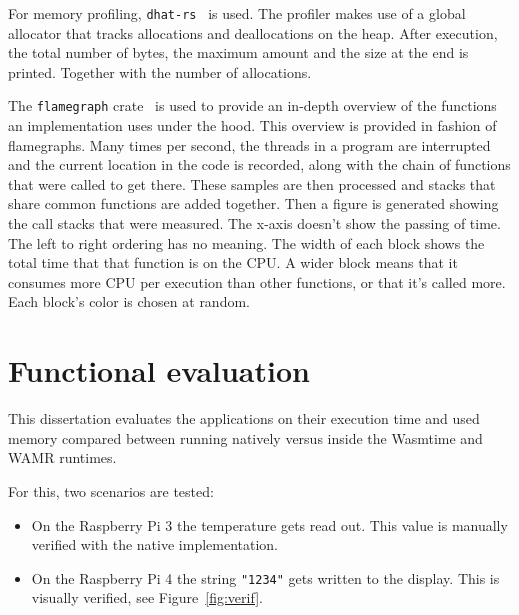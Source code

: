 For memory profiling, \texttt{dhat-rs}~\cite{gh:dhat} is used. The profiler makes use of a global allocator that tracks allocations and deallocations on the heap. After execution, the total number of bytes, the maximum amount and the size at the end is printed. Together with the number of allocations.

The \texttt{flamegraph} crate~\cite{gh:flamegraph} is used to provide an in-depth overview of the functions an implementation uses under the hood. This overview is provided in fashion of flamegraphs. Many times per second, the threads in a program are interrupted and the current location in the code is recorded, along with the chain of functions that were called to get there. These samples are then processed and stacks that share common functions are added together. Then a figure is generated showing the call stacks that were measured. The x-axis doesn't show the passing of time. The left to right ordering has no meaning. The width of each block shows the total time that that function is on the CPU. A wider block means that it consumes more CPU per execution than other functions, or that it's called more. Each block's color is chosen at random.


\section{Functional evaluation}

This dissertation evaluates the applications on their execution time and used memory compared between running natively versus inside the Wasmtime and \gls{WAMR} runtimes. 

For this, two scenarios are tested:

\begin{itemize}
  \item On the Raspberry Pi 3 the temperature gets read out. This value is manually verified with the native implementation.
  \item On the Raspberry Pi 4 the string \texttt{"1234"} gets written to the display. This is visually verified, see Figure~\ref{fig:verif}.
\end{itemize}

